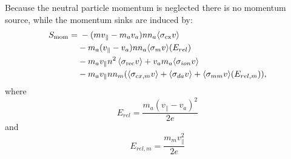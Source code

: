\documentclass[amsmath,amssymb,a4]{revtex4-2}
\begin{document}
Because the neutral particle momentum is neglected there is no momentum source, while the momentum sinks are induced by:
\begin{equation}
\begin{aligned}
     S_{\rm mom} = & \; -(mv_\parallel-m_av_a)n n_a \langle\sigma_{\rm{cx}}v\rangle \\
     &-m_a(v_\parallel-v_a)nn_a\langle\sigma_m v\rangle(E_{rel}) \\
     &-m_av_\parallel n^2\left\langle\sigma_{\mathrm{rec}} v\right\rangle+v_am_a\langle \sigma_{ion}v\rangle \\
     &- m_a v_\parallel nn_m(\langle\sigma_{cx,m} v \rangle+\langle\sigma_{da} v \rangle +\langle\sigma_{mm} v\rangle(E_{rel,m})) ,
\end{aligned}
\label{eq:momentum_source}
\end{equation}
    where 
\begin{equation}
    E_{rel} = \frac{m_a(v_\parallel-v_a)^2}{2e}
\end{equation}
and
\begin{equation}
    E_{rel,m} = \frac{m_mv_\parallel^2}{2e}
\end{equation}
\end{document}
